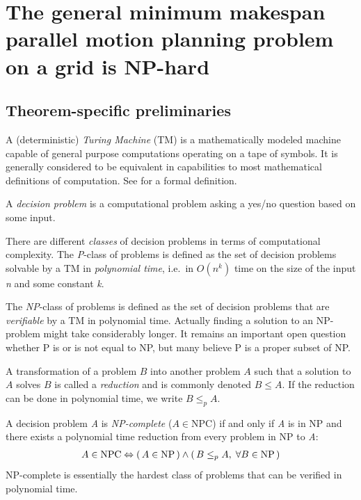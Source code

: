 \section{The general minimum makespan parallel motion planning problem on a grid is NP-hard}\label{chapter:main_proof}

\subsection{Theorem-specific preliminaries}

A (deterministic) \emph{Turing Machine} (TM) is a mathematically modeled machine capable of general purpose computations operating on a tape of symbols. 
It is generally considered to be equivalent in capabilities to most mathematical definitions of computation. 
See \cite{aw/HopcroftU79} for a formal definition.

A \emph{decision problem} is a computational problem asking a yes/no question based on some input.

There are different \emph{classes} of decision problems in terms of computational complexity. 
The \emph{P}-class of problems is defined as the set of decision problems solvable by a TM in \emph{polynomial time}, i.e.\ in \(O(n^k)\) time on the size of the input \emph{n} and some constant \emph{k}.

The \emph{NP}-class of problems is defined as the set of decision problems that are \emph{verifiable} by a TM in polynomial time. 
Actually finding a solution to an NP-problem might take considerably longer. 
It remains an important open question whether P is or is not equal to NP, but many believe P is a proper subset of NP.

A transformation of a problem \(B\) into another problem \(A\) such that a solution to \(A\) solves \(B\) is called a \emph{reduction} and is commonly denoted \(B \leq A\). 
If the reduction can be done in polynomial time, we write \(B \leq_p A\).

\begin{definition}\label{def:np_complete}
	A decision problem \emph{A} is \emph{NP-complete} (\(A \in \text{NPC}\)) if and only if \emph{A} is in NP and there exists a polynomial time reduction from every problem in NP to \emph{A}:
	\begin{align*}
		A \in \text{NPC} \Leftrightarrow (\, A \in \text{NP} \,) \land (\, B \leq_p A, \; \forall B \in \text{NP} \,)
	\end{align*}
	NP-complete is essentially the hardest class of problems that can be verified in polynomial time. 
\end{definition}


